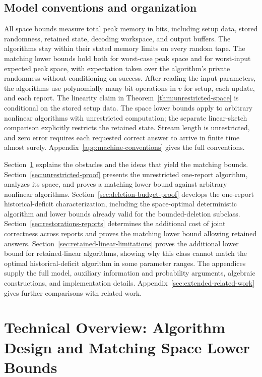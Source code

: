 \documentclass[11pt,letterpaper]{article}
\numberwithin{equation}{section}
\begin{document}
\subsection{Model conventions and organization}
\label{sec:model-organization}

All space bounds measure total peak memory in bits, including setup data, stored randomness, retained state, decoding workspace, and output buffers.
The algorithms stay within their stated memory limits on every random tape.
The matching lower bounds hold both for worst-case peak space and for worst-input expected peak space, with expectation taken over the algorithm's private randomness without conditioning on success.
After reading the input parameters, the algorithms use polynomially many bit operations in $v$ for setup, each update, and each report.
The linearity claim in Theorem~\ref{thm:unrestricted-space} is conditional on the stored setup data.
The space lower bounds apply to arbitrary nonlinear algorithms with unrestricted computation; the separate linear-sketch comparison explicitly restricts the retained state.
Stream length is unrestricted, and zero error requires each requested correct answer to arrive in finite time almost surely.
Appendix~\ref{app:machine-conventions} gives the full conventions.

Section~\ref{sec:technical-overview} explains the obstacles and the ideas that yield the matching bounds.
Section~\ref{sec:unrestricted-proof} presents the unrestricted one-report algorithm, analyzes its space, and proves a matching lower bound against arbitrary nonlinear algorithms.
Section~\ref{sec:deletion-budget-proof} develops the one-report historical-deficit characterization, including the space-optimal deterministic algorithm and lower bounds already valid for the bounded-deletion subclass.
Section~\ref{sec:restorations-reports} determines the additional cost of joint correctness across reports and proves the matching lower bound allowing retained answers.
Section~\ref{sec:retained-linear-limitations} proves the additional lower bound for retained-linear algorithms, showing why this class cannot match the optimal historical-deficit algorithm in some parameter ranges.
The appendices supply the full model, auxiliary information and probability arguments, algebraic constructions, and implementation details.
Appendix~\ref{sec:extended-related-work} gives further comparisons with related work.

\section{Technical Overview: Algorithm Design and Matching Space Lower Bounds}
\label{sec:technical-overview}
\end{document}
